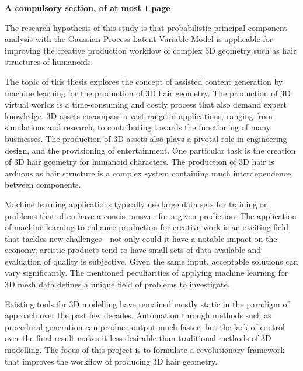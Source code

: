 \documentclass[ %
                    author={Dillon Keith Diep},
                supervisor={Dr. Carl Henrik Ek},
                    degree={MEng},
                     title={Assisted Content Generation for 3D Hair Geometry},
                  subtitle={[INCOMPLETE DRAFT, CONTAINS NOTES FROM RESEARCH]},
                      type={Research},
                      year={2014} ]{dissertation}
\begin{document}
{\bf A compulsory section, of at most $1$ page} 
\vspace{1cm} 

\noindent
The research hypothesis of this study is that probabilistic principal component analysis with the
Gaussian Process Latent Variable Model is applicable for improving the creative production workflow of complex 3D geometry such as hair structures of humanoids.

The topic of this thesis explores the concept of assisted content generation by machine learning for the production of 3D hair geometry. The production of 3D virtual worlds is a time-consuming and costly process that also demand expert knowledge. 3D assets encompass a vast range of applications, ranging from simulations and research, to contributing towards the functioning of many businesses. The production of 3D assets also plays a pivotal role in engineering design, and the provisioning of entertainment. One particular task is the creation of 3D hair geometry for humanoid characters. The production of 3D hair is arduous as hair structure is a complex system containing much interdependence between components.

Machine learning applications typically use large data sets for training on problems that often have a concise answer for a given prediction. The application of machine learning to enhance production for creative work is an exciting field that tackles new challenges - not only could it have a notable impact on the economy, artistic products tend to have small sets of data available and evaluation of quality is subjective. Given the same input, acceptable solutions can vary significantly. The mentioned peculiarities of applying machine learning for 3D mesh data defines a unique field of problems to investigate.

Existing tools for 3D modelling have remained mostly static in the paradigm of approach over the past few decades. Automation through methods such as procedural generation can produce output much faster, but the lack of control over the final result makes it less desirable than traditional methods of 3D modelling. The focus of this project is to formulate a revolutionary framework that improves the workflow of producing 3D hair geometry.
\end{document}
